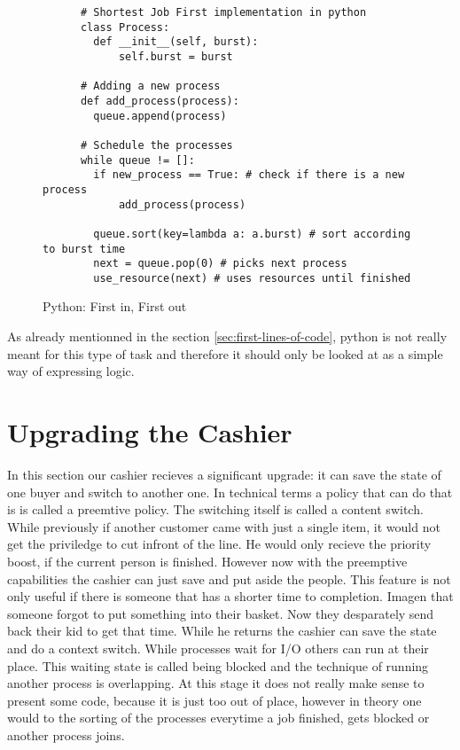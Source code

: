 \begin{figure}[h]
    \begin{verbatim}
      # Shortest Job First implementation in python
      class Process:
        def __init__(self, burst):
            self.burst = burst

      # Adding a new process
      def add_process(process):
        queue.append(process)

      # Schedule the processes
      while queue != []:
        if new_process == True: # check if there is a new process
            add_process(process)
        
        queue.sort(key=lambda a: a.burst) # sort according to burst time
        next = queue.pop(0) # picks next process
        use_resource(next) # uses resources until finished
    \end{verbatim}
    \caption{Python: First in, First out}
    \label{code:sjf}
\end{figure}

As already mentionned in the section \ref{sec:first-lines-of-code}, python is not really meant for this type of task and therefore it should only be looked at as a simple way of expressing logic.

\section{Upgrading the Cashier}

In this section our cashier recieves a significant upgrade: it can save the state of one buyer and switch to another one.
In technical terms a policy that can do that is is called a preemtive policy. 
The switching itself is called a content switch.
While previously if another customer came with just a single item, it would not get the priviledge to cut infront of the line. 
He would only recieve the priority boost, if the current person is finished.
However now with the preemptive capabilities the cashier can just save and put aside the people.
This feature is not only useful if there is someone that has a shorter time to completion.
Imagen that someone forgot to put something into their basket.
Now they desparately send back their kid to get that time. While he returns the cashier can save the state and do a context switch.
While processes wait for I/O others can run at their place.
This waiting state is called being blocked and the technique of running another process is overlapping.
At this stage it does not really make sense to present some code, because it is just too out of place, however in theory one would to the sorting of the processes everytime a job finished, gets blocked or another process joins.

